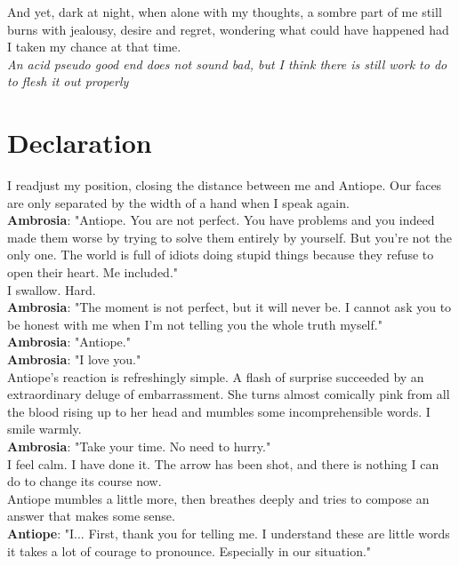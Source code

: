 \documentclass{report}
\newcommand{\dcomment}[1]{
	\emph{#1}
	\\
}
\newcommand{\speaker}[1]{
	\textbf{#1}: 
}
\newcommand{\gsection}[1]{
	\section*{#1}
	\label{#1}
}
\begin{document}
And yet, dark at night, when alone with my thoughts, a sombre part of me still burns with jealousy, desire and regret, wondering what could have happened had I taken my chance at that time.\\

\dcomment{
	An acid pseudo good end does not sound bad, but I think there is still work to do to flesh it out properly
}

\gsection{Declaration}

I readjust my position, closing the distance between me and Antiope. Our faces are only separated by the width of a hand when I speak again.\\

\speaker{Ambrosia} "Antiope. You are not perfect. You have problems and you indeed made them worse by trying to solve them entirely by yourself. But you're not the only one. The world is full of idiots doing stupid things because they refuse to open their heart. Me included."\\

I swallow. Hard.\\

\speaker{Ambrosia} "The moment is not perfect, but it will never be. I cannot ask you to be honest with me when I'm not telling you the whole truth myself."\\

\speaker{Ambrosia} "Antiope."\\

\speaker{Ambrosia} "I love you."\\

Antiope's reaction is refreshingly simple. A flash of surprise succeeded by an extraordinary deluge of embarrassment. She turns almost comically pink from all the blood rising up to her head and mumbles some incomprehensible words. I smile warmly.\\

\speaker{Ambrosia} "Take your time. No need to hurry."\\

I feel calm. I have done it. The arrow has been shot, and there is nothing I can do to change its course now.\\

Antiope mumbles a little more, then breathes deeply and tries to compose an answer that makes some sense.\\

\speaker{Antiope} "I... First, thank you for telling me. I understand these are little words it takes a lot of courage to pronounce. Especially in our situation."\\
\end{document}
